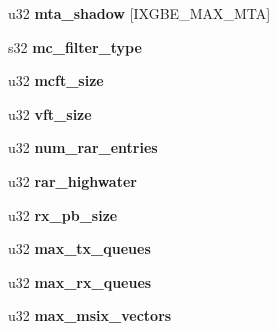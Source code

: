 \begin{DoxyCompactItemize}
\item 
\hypertarget{structixgbe__mac__info_a1291aa82b95c99be7619477e470840ca}{
u32 {\bfseries mta\_\-shadow} \mbox{[}IXGBE\_\-MAX\_\-MTA\mbox{]}}
\label{structixgbe__mac__info_a1291aa82b95c99be7619477e470840ca}

\item 
\hypertarget{structixgbe__mac__info_aaee3293da426ec23e94343e2064f380f}{
s32 {\bfseries mc\_\-filter\_\-type}}
\label{structixgbe__mac__info_aaee3293da426ec23e94343e2064f380f}

\item 
\hypertarget{structixgbe__mac__info_a7a70c028216f8a3604d1e154f65ffe99}{
u32 {\bfseries mcft\_\-size}}
\label{structixgbe__mac__info_a7a70c028216f8a3604d1e154f65ffe99}

\item 
\hypertarget{structixgbe__mac__info_aeb0571259d3e96b7b8ae3cb0d23f6812}{
u32 {\bfseries vft\_\-size}}
\label{structixgbe__mac__info_aeb0571259d3e96b7b8ae3cb0d23f6812}

\item 
\hypertarget{structixgbe__mac__info_ab73051fa1b74be2085c4053190c10aec}{
u32 {\bfseries num\_\-rar\_\-entries}}
\label{structixgbe__mac__info_ab73051fa1b74be2085c4053190c10aec}

\item 
\hypertarget{structixgbe__mac__info_a57c2eef2003cf5dce6f8cbd83d199959}{
u32 {\bfseries rar\_\-highwater}}
\label{structixgbe__mac__info_a57c2eef2003cf5dce6f8cbd83d199959}

\item 
\hypertarget{structixgbe__mac__info_a6c8e9df67258a2ac6972952afa610a4d}{
u32 {\bfseries rx\_\-pb\_\-size}}
\label{structixgbe__mac__info_a6c8e9df67258a2ac6972952afa610a4d}

\item 
\hypertarget{structixgbe__mac__info_a539aca02bc3667746406e9821dcd43ea}{
u32 {\bfseries max\_\-tx\_\-queues}}
\label{structixgbe__mac__info_a539aca02bc3667746406e9821dcd43ea}

\item 
\hypertarget{structixgbe__mac__info_aedf51ba2d3a921e8cc9e8d5ce05b358d}{
u32 {\bfseries max\_\-rx\_\-queues}}
\label{structixgbe__mac__info_aedf51ba2d3a921e8cc9e8d5ce05b358d}

\item 
\hypertarget{structixgbe__mac__info_a459977e846d9404d9abc159a396dce78}{
u32 {\bfseries max\_\-msix\_\-vectors}}
\label{structixgbe__mac__info_a459977e846d9404d9abc159a396dce78}


\end{DoxyCompactItemize}
